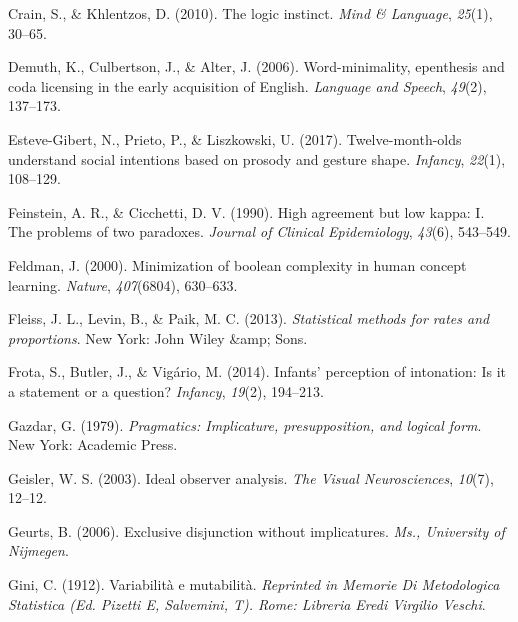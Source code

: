 \documentclass[
  ,man,floatsintext]{apa6}
\newlength{\cslhangindent}
\newlength{\cslentryspacingunit} %
\newenvironment{CSLReferences}[2] %
 {%
  \setlength{\parindent}{0pt}
  \ifodd #1
  \let\oldpar\par
  \def\par{\hangindent=\cslhangindent\oldpar}
  \fi
  \setlength{\parskip}{#2\cslentryspacingunit}
 }%
 {}
\begin{document}
\begin{CSLReferences}{1}{0}
\leavevmode{}%
Crain, S., \& Khlentzos, D. (2010). The logic instinct. \emph{Mind \& Language}, \emph{25}(1), 30--65.

\leavevmode{}%
Demuth, K., Culbertson, J., \& Alter, J. (2006). Word-minimality, epenthesis and coda licensing in the early acquisition of {E}nglish. \emph{Language and Speech}, \emph{49}(2), 137--173.

\leavevmode{}%
Esteve-Gibert, N., Prieto, P., \& Liszkowski, U. (2017). Twelve-month-olds understand social intentions based on prosody and gesture shape. \emph{Infancy}, \emph{22}(1), 108--129.

\leavevmode{}%
Feinstein, A. R., \& Cicchetti, D. V. (1990). High agreement but low kappa: I. The problems of two paradoxes. \emph{Journal of Clinical Epidemiology}, \emph{43}(6), 543--549.

\leavevmode{}%
Feldman, J. (2000). Minimization of boolean complexity in human concept learning. \emph{Nature}, \emph{407}(6804), 630--633.

\leavevmode{}%
Fleiss, J. L., Levin, B., \& Paik, M. C. (2013). \emph{Statistical methods for rates and proportions}. New York: John Wiley \&amp; Sons.

\leavevmode{}%
Frota, S., Butler, J., \& Vigário, M. (2014). Infants' perception of intonation: Is it a statement or a question? \emph{Infancy}, \emph{19}(2), 194--213.

\leavevmode{}%
Gazdar, G. (1979). \emph{Pragmatics: Implicature, presupposition, and logical form}. New York: Academic Press.

\leavevmode{}%
Geisler, W. S. (2003). Ideal observer analysis. \emph{The Visual Neurosciences}, \emph{10}(7), 12--12.

\leavevmode{}%
Geurts, B. (2006). Exclusive disjunction without implicatures. \emph{Ms., University of Nijmegen}.

\leavevmode{}%
Gini, C. (1912). Variabilit{à} e mutabilit{à}. \emph{Reprinted in Memorie Di Metodologica Statistica (Ed. Pizetti E, Salvemini, T). Rome: Libreria Eredi Virgilio Veschi}.


\end{CSLReferences}
\end{document}
